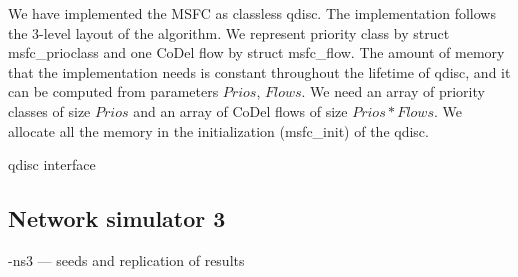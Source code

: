 We have implemented the MSFC as classless qdisc. The implementation follows the 3-level layout of the algorithm. We represent priority class by struct msfc\_prioclass and one CoDel flow by struct msfc\_flow. The amount of memory that the implementation needs is constant throughout the lifetime of qdisc, and it can be computed from parameters $Prios$, $Flows$. We need an array of priority classes of size $Prios$ and an array of CoDel flows of size $Prios * Flows$. We allocate all the memory in the initialization (msfc\_init) of the qdisc.




qdisc interface

\subsection {Network simulator 3}

-ns3 --- seeds and replication of results


